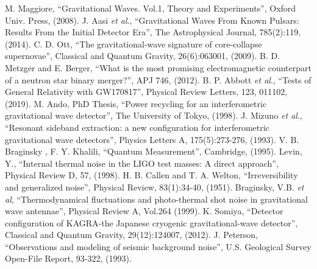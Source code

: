 \vspace{6mm}
  M. Maggiore, ``Gravitational Waves. Vol.1, Theory and Experiments'', Oxford Univ. Press, (2008).
\vspace{2mm}
  J. Aasi \textit{et al}., ``Gravitational Waves From Known Pulsars: Results From the Initial Detector Era'', The Astrophysical Journal, 785(2):119, (2014).
\vspace{2mm}
  C. D. Ott, ``The gravitational-wave signature of core-collapse supernovae'', Classical and Quantum Gravity, 26(6):063001, (2009).
\vspace{2mm}
  B. D. Metzger and E. Berger, ``What is the most promising electromagnetic counterpart of a neutron star binary merger?'', APJ 746, (2012).
\vspace{2mm}
  B. P. Abbott \textit{et al}., ``Tests of General Relativity with GW170817'', Physical Review Letters, 123, 011102, (2019).
\vspace{2mm}
  M. Ando, PhD Thesis, ``Power recycling for an interferometric gravitational wave detector'', The University of Tokyo, (1998).
\vspace{2mm}
  J. Mizuno \textit{et al}., ``Resonant sideband extraction: a new configuration for interferometric gravitational wave detectors'', Physics Letters A, 175(5):273-276, (1993).
\vspace{2mm}
  V. B. Braginsky , F. Y. Khalili, ``Quantum Measurement'', Cambridge, (1995).
\vspace{2mm}
  Levin, Y., ``Internal thermal noise in the LIGO test masses: A direct approach'', Physical Review D, 57, (1998).
\vspace{2mm}
  H. B. Callen and T. A. Welton, ``Irreversibility and generalized noise'', Physical Review, 83(1):34-40, (1951).
\vspace{2mm}
  Braginsky, V.B. \textit{et al}, ``Thermodynamical fluctuations and photo-thermal shot noise in gravitational wave antennae'', Physical Review A, Vol.264 (1999).
\vspace{2mm}
  K. Somiya, ``Detector configuration of KAGRA-the Japanese cryogenic gravitational-wave detector'', Classical and Quantum Gravity, 29(12):124007, (2012).
\vspace{2mm}
 J. Peterson, ``Observations and modeling of seismic background noise'', U.S. Geological Survey Open-File Report, 93-322, (1993).
